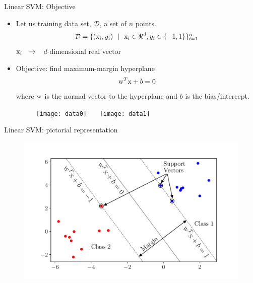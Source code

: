 \begin{frame}{Linear SVM: Objective}
\begin{itemize}
\item Let us training data set, $\mathcal{D}$, a set of $n$ points.
\[\mathcal{D}=\{({\rm x}_i,y_i)~~|~~{\rm x}_i\in \Re ^d, y_i\in \{-1,1\}\}^n_{i=1}\]
${\rm x}_i~~\rightarrow$~~$d$-dimensional real vector
\item {\color{mycolor2} Objective}: find maximum-margin hyperplane 
\[{\rm w}^T{\rm x}+b=0\]
where ${\rm w}$ is the normal vector to the hyperplane and $b$ is the bias/intercept.
\begin{figure}
\texttt{[image: data0]}~~~
\texttt{[image: data1]}
\end{figure}
\end{itemize}
\end{frame}


\begin{frame}{Linear SVM: pictorial representation}
\begin{figure}
\includegraphics[scale=0.55]{Figures/data5}
\end{figure}
\end{frame}

